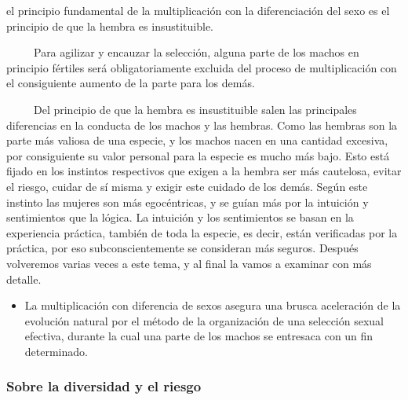 \begin{tcolorbox}
 el principio fundamental de la multiplicación con la \mbox{diferenciación} del sexo es el principio de que la hembra es \mbox{insustituible}.
\end{tcolorbox}


~ ~ ~ Para agilizar y encauzar la selección, alguna parte de los machos
en principio fértiles será obligatoriamente excluida del proceso de
multiplicación con el consiguiente aumento de la parte para los demás.


~ ~ ~ Del principio de que la hembra es insustituible salen las
principales diferencias en la conducta de los machos y las hembras. Como
las hembras son la parte más valiosa de una especie, y los machos nacen
en una cantidad excesiva, por consiguiente su valor personal para la
especie es mucho más bajo. Esto está fijado en los instintos respectivos
que exigen a la hembra ser más cautelosa, evitar el riesgo, cuidar de sí
misma y exigir este cuidado de los demás. Según este instinto las
mujeres son más egocéntricas, y se guían más por la intuición y
sentimientos que la lógica. La intuición y los sentimientos se basan en
la experiencia práctica, también de toda la especie, es decir, están
verificadas por la práctica, por eso subconscientemente se consideran
más seguros. Después volveremos varias veces a este tema, y al final la
vamos a examinar con más detalle.

\begin{itemize}

\item
  La multiplicación con diferencia de sexos asegura una brusca
  aceleración de la evolución natural por el método de la organización
  de una selección sexual efectiva, durante la cual una parte de los
  machos se entresaca con un fin determinado.
\end{itemize}

\protect\hypertarget{M5}{}{}

\subsubsection{Sobre la diversidad y el riesgo}
\label{sobre-la-diversidad-y-el-riesgo}

